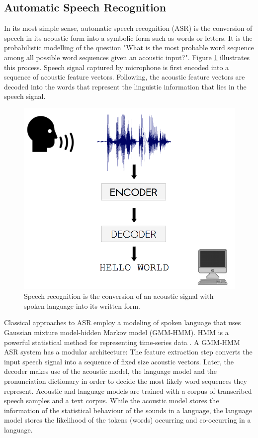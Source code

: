 
\subsection{Automatic Speech Recognition}
\label{sota:asr}

In its most simple sense, automatic speech recognition (ASR) is the conversion of speech in its acoustic form into a symbolic form such as words or letters. It is the probabilistic modelling of the question "What is the most probable word sequence among all possible word sequences given an acoustic input?". Figure \ref{sota:asr_process} illustrates this process. Speech signal captured by microphone is first encoded into a sequence of acoustic feature vectors. Following, the acoustic feature vectors are decoded into the words that represent the linguistic information that lies in the speech signal. 

\begin{figure}[t]
  \centering
  \includegraphics[width=0.7\linewidth]{img/asr_schema.png}
  \caption{Speech recognition is the conversion of an acoustic signal with spoken language into its written form. }
  \label{sota:asr_process}
\end{figure}

Classical approaches to ASR employ a modeling of spoken language that uses Gaussian mixture model-hidden Markov model (GMM-HMM). HMM is a powerful statistical method for representing time-series data \citep{slp_book, hmm_balls}. A GMM-HMM ASR system has a modular architecture: The feature extraction step converts the input speech signal into a sequence of fixed size acoustic vectors. Later, the decoder makes use of the acoustic model, the language model and the pronunciation dictionary in order to decide the most likely word sequences they represent. Acoustic and language models are trained with a corpus of transcribed speech samples and a text corpus. While the acoustic model stores the information of the statistical behaviour of the sounds in a language, the language model stores the likelihood of the tokens (words) occurring and co-occurring in a language. 

